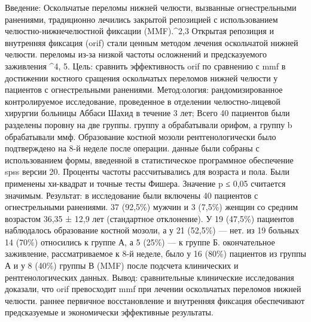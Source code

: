 Введение: Оскольчатые переломы нижней челюсти, вызванные огнестрельными
ранениями, традиционно лечились закрытой репозицией с использованием
челюстно-нижнечелюстной фиксации (MMF).^2,3 Открытая репозиция и внутренняя
фиксация (orif) стали ценным методом лечения оскольчатой нижней
челюсти. переломы из-за низкой частоты осложнений и предсказуемого заживления
^4, 5. Цель: сравнить эффективность orif по сравнению с mmf в достижении
костного сращения оскольчатых переломов нижней челюсти у пациентов с
огнестрельными ранениями. Метод:ология: рандомизированное контролируемое
исследование, проведенное в отделении челюстно-лицевой хирургии больницы Аббаси
Шахид в течение 3 лет; Всего 40 пациентов были разделены поровну на две группы.
группу а обрабатывали орифом, а группу b обрабатывали ммф. Образование костной
мозоли рентгенологически было подтверждено на 8-й неделе после операции. данные
были собраны с использованием формы, введенной в статистическое программное
обеспечение spss версии 20. Проценты частоты рассчитывались для возраста и пола.
Были применены хи-квадрат и точные тесты Фишера. Значение p ≤ 0,05 считается
значимым. Результат: в исследование были включены 40 пациентов с огнестрельными
ранениями. 37 (92,5\%) мужчин и 3 (7,5\%) женщин со средним возрастом 36,35 ±
12,9 лет (стандартное отклонение). У 19 (47,5\%) пациентов наблюдалось
образование костной мозоли, а у 21 (52,5\%) — нет. из 19 больных 14 (70\%)
относились к группе А, а 5 (25\%) — к группе Б. окончательное заживление,
рассматриваемое к 8-й неделе, было у 16 (80\%) пациентов из группы А и у 8
(40\%) группы В (MMF) после подсчета клинических и рентгенологических данных.
Вывод: сравнительные клинические исследования доказали, что orif превосходит mmf
при лечении оскольчатых переломов нижней челюсти. раннее первичное
восстановление и внутренняя фиксация обеспечивают предсказуемые и экономически
эффективные результаты.\cite{siddiqui2020}

